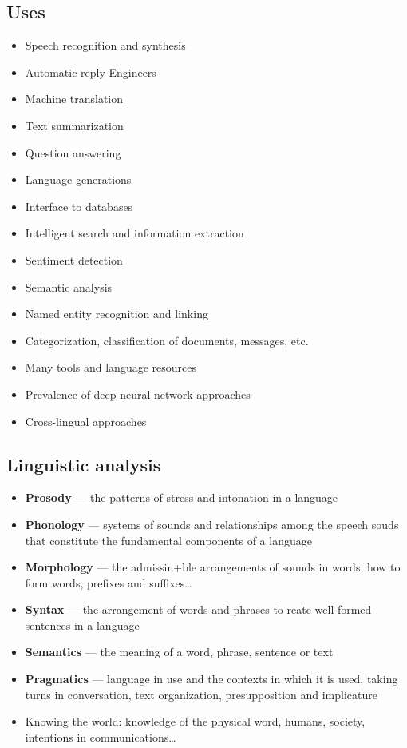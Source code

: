 \documentclass{article}
\begin{document}
    \subsection{Uses}
    \begin{itemize}
        \item Speech recognition and synthesis
        \item Automatic reply Engineers
        \item Machine translation
        \item Text summarization
        \item Question answering
        \item Language generations
        \item Interface to databases
        \item Intelligent search and information extraction
        \item Sentiment detection
        \item Semantic analysis
        \item Named entity recognition and linking
        \item Categorization, classification of documents, messages, etc.
        \item Many tools and language resources
        \item Prevalence of deep neural network approaches
        \item Cross-lingual approaches
    \end{itemize}

    \subsection{Linguistic analysis}
    \begin{itemize}
        \item \textbf{Prosody} --- the patterns of stress and intonation in a language
        \item \textbf{Phonology} --- systems of sounds and relationships among the speech souds that constitute the fundamental components of a language
        \item \textbf{Morphology} --- the admissin+ble arrangements of sounds in words; how to form words, prefixes and suffixes\ldots
        \item \textbf{Syntax} --- the arrangement of words and phrases to reate well-formed sentences in a language
        \item \textbf{Semantics} --- the meaning of a word, phrase, sentence or text
        \item \textbf{Pragmatics} --- language in use and the contexts in which it is used, taking turns in conversation, text organization, presupposition and implicature
        \item Knowing the world: knowledge of the physical word, humans, society, intentions in communications\ldots
    \end{itemize}
\end{document}
